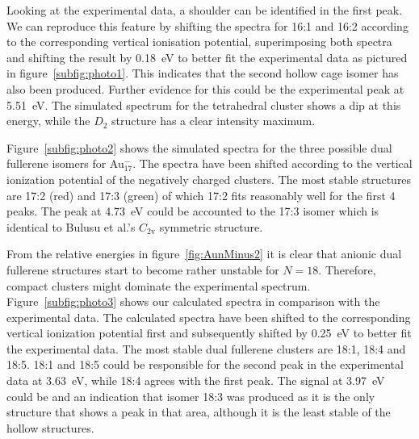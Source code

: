 %
Looking at the experimental data, a shoulder can be identified in the first
peak. We can reproduce this feature by shifting the spectra for 16:1 and 16:2
according to the corresponding vertical ionisation potential, superimposing both
spectra and shifting the result by 0.18~eV to better fit the experimental data
as pictured in figure~\ref{subfig:photo1}. This indicates that the second
hollow cage isomer has also been produced. Further evidence for this could be
the experimental peak at 5.51~eV. The simulated spectrum for the tetrahedral
cluster shows a dip at this energy, while the $D_\mathrm{2}$ structure has a
clear intensity maximum. 

Figure~\ref{subfig:photo2} shows the simulated spectra for the three possible
dual fullerene isomers for Au$_{17}^-$. The spectra have been shifted according
to the vertical ionization potential of the negatively charged clusters. The
most stable structures are 17:2 (red) and 17:3 (green) of which 17:2 fits
reasonably well for the first 4 peaks. The peak at 4.73~eV could be accounted
to the 17:3 isomer which is identical to Bulusu et al.'s $C_\mathrm{2v}$
symmetric structure.

From the relative energies in figure~\ref{fig:AunMinus2} it is clear that
anionic dual fullerene structures start to become rather unstable for $N=18$.
Therefore, compact clusters might dominate the experimental spectrum.
Figure~\ref{subfig:photo3} shows our calculated spectra in comparison
with the experimental data. The calculated spectra have been shifted to the
corresponding vertical ionization potential first and subsequently shifted by
0.25~eV to better fit the experimental data. The most stable dual fullerene
clusters are 18:1, 18:4 and 18:5. 18:1 and 18:5 could be responsible for the
second peak in the experimental data at 3.63~eV, while 18:4 agrees with the
first peak. The signal at 3.97~eV could be and an indication that isomer 18:3
was produced as it is the only structure that shows a peak in that area,
although it is the least stable of the hollow structures.

